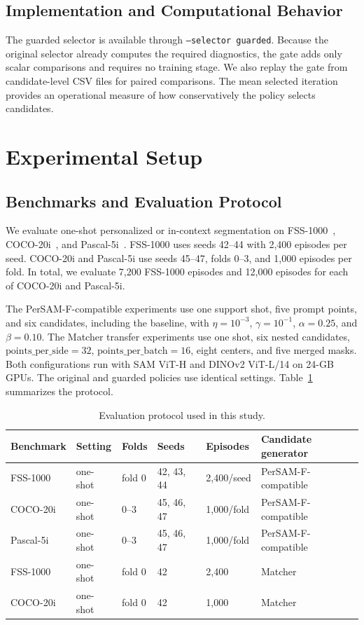 \documentclass{CVM}
\begin{document}
\subsection{Implementation and Computational Behavior}

The guarded selector is available through \texttt{--selector guarded}. Because the original selector already computes the required diagnostics, the gate adds only scalar comparisons and requires no training stage. We also replay the gate from candidate-level CSV files for paired comparisons. The mean selected iteration provides an operational measure of how conservatively the policy selects candidates.

\section{Experimental Setup}

\subsection{Benchmarks and Evaluation Protocol}

We evaluate one-shot personalized or in-context segmentation on FSS-1000~\cite{10}, COCO-20i~\cite{11}, and Pascal-5i~\cite{3}. FSS-1000 uses seeds 42--44 with 2,400 episodes per seed. COCO-20i and Pascal-5i use seeds 45--47, folds 0--3, and 1,000 episodes per fold. In total, we evaluate 7,200 FSS-1000 episodes and 12,000 episodes for each of COCO-20i and Pascal-5i.

The PerSAM-F-compatible experiments use one support shot, five prompt points, and six candidates, including the baseline, with $\eta=10^{-3}$, $\gamma=10^{-1}$, $\alpha=0.25$, and $\beta=0.10$. The Matcher transfer experiments use one shot, six nested candidates, $\mathrm{points\_per\_side}=32$, $\mathrm{points\_per\_batch}=16$, eight centers, and five merged masks. Both configurations run with SAM ViT-H and DINOv2 ViT-L/14 on 24-GB GPUs. The original and guarded policies use identical settings. Table~\ref{tab:protocol} summarizes the protocol.

\begin{table}[h!t]
\center
\caption{Evaluation protocol used in this study.}
\begin{tabular}{llllll}
\toprule
Benchmark & Setting & Folds & Seeds & Episodes & Candidate generator \\
\midrule
FSS-1000 & one-shot & fold 0 & 42, 43, 44 & 2,400/seed & PerSAM-F-compatible \\
COCO-20i & one-shot & 0--3 & 45, 46, 47 & 1,000/fold & PerSAM-F-compatible \\
Pascal-5i & one-shot & 0--3 & 45, 46, 47 & 1,000/fold & PerSAM-F-compatible \\
FSS-1000 & one-shot & fold 0 & 42 & 2,400 & Matcher \\
COCO-20i & one-shot & fold 0 & 42 & 1,000 & Matcher \\
\bottomrule
\end{tabular}
\label{tab:protocol}
\end{table}
\end{document}
